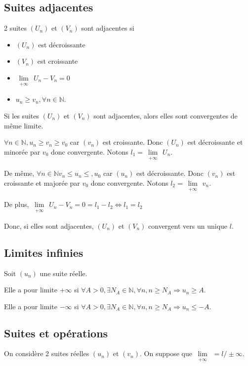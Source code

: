 \documentclass[french]{yLectureNote}
\newcommand{\Lim}[1]{\lim\limits_{\substack{#1}}\:}
\begin{document}
\subsection{Suites adjacentes}
\begin{theorem}[Définition]
2 suites $(U_n)$ et $(V_n)$ sont adjacentes si
\begin{itemize}
 \item $(U_n)$ est décroissante
 \item $(V_n)$ est croissante
 \item $\Lim{+\infty} U_n-V_n = 0$
 \item $u_n\geq v_n, \forall n\in\mathbb{N}$.
\end{itemize}
\end{theorem}

\begin{theorem}[Définition]
Si les suites $(U_n)$ et $(V_n)$ sont adjacentes, alors elles sont convergentes de m\^eme limite.

\end{theorem}
\begin{myproof}
$\forall n\in\mathbb{N}, u_n\geq v_n\geq v_0$ car $(v_n)$ est croissante. Donc $(U_n)$ est décroissante et minorée par $v_0$ donc convergente. Notons $l_1 = \Lim{+\infty} U_n$.

De m\^eme, $\forall n\in\mathbb{N}v_n\leq u_n\leq, u_0$ car $(u_n)$ est décroissante. Donc $(v_n)$ est croissante et majorée par $v_0$ donc convergente. Notons $l_2 = \Lim{+\infty} v_n$.

De plus, $\Lim{+\infty} U_n-V_n = 0 = l_1-l_2 \iff l_1 = l_2$

Donc, si elles sont adjacentes, $(U_n)$ et $(V_n)$ convergent vers un unique $l$.
\end{myproof}
\subsection{Limites infinies}
Soit $(u_n)$ une suite réelle.
\begin{theorem}[définition]
Elle a pour limite $+\infty$ si $\forall A>0, \exists N_A \in \mathbb{N}, \forall n, n\geq N_A \Rightarrow u_n \geq A$.

Elle a pour limite $-\infty$ si $\forall A>0, \exists N_A \in \mathbb{N}, \forall n, n\geq N_A \Rightarrow u_n \leq -A$.
\end{theorem}
\subsection{Suites et opérations}
On considère 2 suites réelles $(u_n)$ et $(v_n)$. On suppose que $\Lim{+\infty} = l/\pm\infty$.
\end{document}
